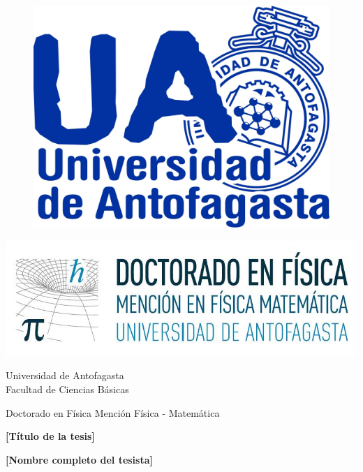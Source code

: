 \documentclass[lettersize,12pt]{report}
\begin{document}
\thispagestyle{empty}

\begin{figure}
	\includegraphics[scale=.22]{./logouajpg.jpg}
\end{figure}

\vspace*{-32mm}
\begin{flushright}
	\includegraphics[scale=.27]{./logodoctorado.jpg}
\end{flushright}

\vspace*{3mm}
\begin{center}
	\begin{large}
		{\Large Universidad de Antofagasta}\\
		Facultad de Ciencias B\'asicas
		
		\vspace*{10mm}
		Doctorado en F\'isica Menci\'on F\'isica - Matem\'atica
		
		\vspace*{40mm}
		{\bf \LARGE [T\'itulo de la tesis] }
		
		\vspace*{10mm}
		{\bf [Nombre completo del tesista] }
		
		\vspace*{15mm}
	\end{large}	
\end{center}
\end{document}
